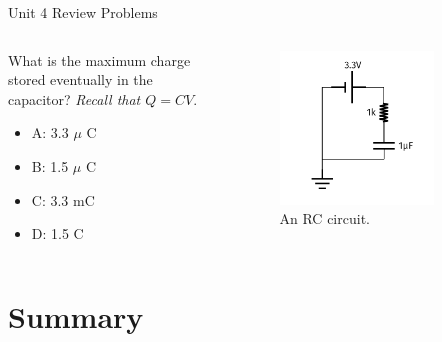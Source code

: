 \documentclass{beamer}
\begin{document}
\begin{frame}{Unit 4 Review Problems}
\begin{columns}[T]
\begin{column}{0.5\textwidth}
What is the maximum charge stored eventually in the capacitor?  \textit{Recall that $Q = CV$}.
\begin{itemize}
\item A: 3.3 $\mu$ C
\item B: 1.5 $\mu$ C
\item C: 3.3 mC
\item D: 1.5 C
\end{itemize}
\end{column}
\begin{column}{0.5\textwidth}
\begin{figure}
\centering
\includegraphics[width=0.8\textwidth]{figures/iVCurve7.pdf}
\caption{\label{fig:RC2} An RC circuit.}
\end{figure}
\end{column}
\end{columns}
\end{frame}

\section{Summary}
\end{document}
